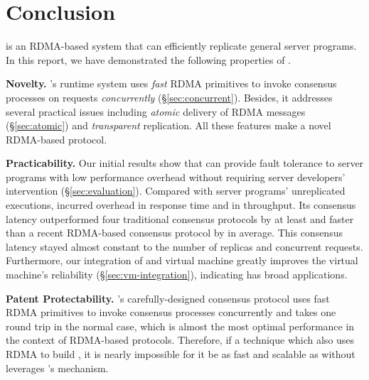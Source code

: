 \section{Conclusion} \label{sec:conclusion}

\xxx is an RDMA-based \paxos system that can efficiently replicate general 
server programs. In this report, we have demonstrated the following properties 
of \xxx.

\textbf{Novelty.} \xxx's runtime system uses \emph{fast} RDMA primitives to 
invoke consensus processes on requests \emph{concurrently} 
(\S\ref{sec:concurrent}). Besides, it addresses several practical issues 
including \emph{atomic} delivery of RDMA messages (\S\ref{sec:atomic}) and  
\emph{transparent} replication. All these features make \xxx a novel RDMA-based 
\paxos protocol.

\textbf{Practicability.} Our initial results show that \xxx can provide fault 
tolerance to server programs with low performance overhead without requiring 
server developers' intervention (\S\ref{sec:evaluation}). Compared with \nprog 
server programs' unreplicated executions, \xxx incurred \latencyoverhead 
overhead in response time and \tputoverhead in throughput. Its consensus 
latency outperformed four traditional consensus protocols by at least 
\comptradlow and faster than a recent RDMA-based consensus protocol \dare by 
\fasterDARE in average. This consensus latency stayed almost constant to the 
number of replicas and concurrent requests. Furthermore, our integration of 
\xxx and virtual machine greatly improves the virtual machine's reliability 
(\S\ref{sec:vm-integration}), indicating \xxx has broad applications.

\textbf{Patent Protectability.} \xxx's carefully-designed consensus protocol 
uses fast RDMA primitives to invoke consensus processes concurrently and takes 
one round trip in the normal case, which is almost the most optimal performance 
in the context of RDMA-based \paxos protocols. Therefore, if a technique which 
also uses RDMA to build \paxos, it is nearly impossible for it be as fast 
and scalable as \xxx without leverages \xxx's mechanism.